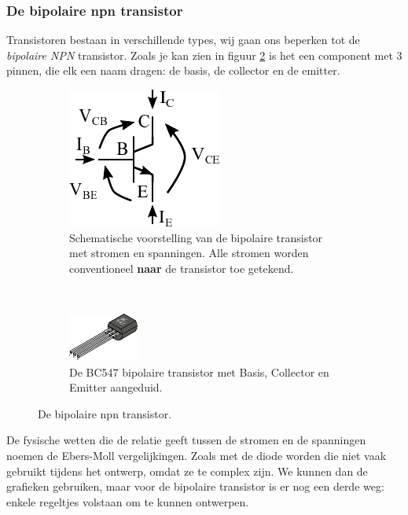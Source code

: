 \documentclass{article}
\begin{document}
			
			\subsubsection{De bipolaire npn transistor}
				 Transistoren bestaan in verschillende types, wij gaan ons beperken tot de \emph{bipolaire NPN} transistor. Zoals je kan zien in figuur \ref{subfig:transistor_bce} is het een component met 3 pinnen, die elk een naam dragen: de basis, de collector en de emitter.
				\begin{figure}[htbp]
				\centering
					\begin{subfigure}[b]{0.45\linewidth}
						\centering
					\includegraphics{transistor_VI}
					\caption{Schematische voorstelling van de bipolaire transistor met stromen en spanningen. Alle stromen worden conventioneel \textbf{naar} de transistor toe getekend.}
					\label{subfig:transistor_vi}
					\end{subfigure}
					~
					\begin{subfigure}[b]{0.45\linewidth}
						\centering
						\includegraphics[scale=2]{transistor}
						\caption{De BC547 bipolaire transistor met Basis, Collector en Emitter aangeduid.}
						\label{subfig:transistor_bce}
					\end{subfigure}
					
					\caption{De bipolaire npn transistor.}
					\label{fig:transistor}
				\end{figure}

				De fysische wetten die de relatie geeft tussen de stromen en de spanningen noemen de Ebers-Moll vergelijkingen. Zoals met de diode worden die niet vaak gebruikt tijdens het ontwerp, omdat ze te complex zijn. We kunnen dan  de grafieken gebruiken, maar voor de bipolaire transistor is er nog een derde weg: enkele regeltjes volstaan om te kunnen ontwerpen. 
\end{document}
